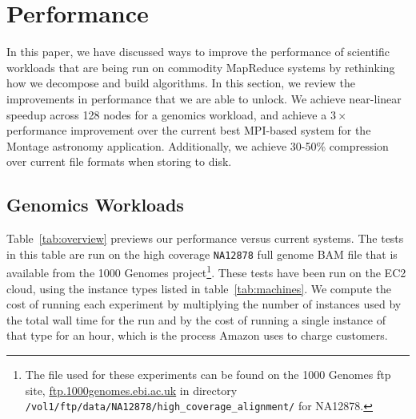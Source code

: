 \documentclass{acm_proc_article-sp}
\begin{document}
\section{Performance}
\label{sec:performance}

In this paper, we have discussed ways to improve the performance of scientific workloads that are
being run on commodity MapReduce systems by rethinking how we decompose and build algorithms.
In this section, we review the improvements in performance that we are able to unlock. We achieve
near-linear speedup across 128 nodes for a genomics workload, and achieve a $3\times$ performance
improvement over the current best MPI-based system for the Montage astronomy application.
Additionally, we achieve 30-50\% compression over current file formats when storing to disk.

\subsection{Genomics Workloads}
\label{sec:genomics-performance}

Table~\ref{tab:overview} previews our performance versus current systems. The tests in this table are run on the
high coverage \texttt{NA12878} full genome BAM file that is available from the 1000 Genomes
project\footnote{The file used for these experiments can be found on the
1000 Genomes ftp site, \url{ftp.1000genomes.ebi.ac.uk} in directory 
\texttt{/vol1/ftp/data/NA12878/high\_coverage\_alignment/} for NA12878.}. These tests have been run on the EC2 
cloud, using the instance types listed in table~\ref{tab:machines}. We compute the cost of running each
experiment by multiplying the number of instances used by the total wall time for the run and by the cost of
running a single instance of that type for an hour, which is the process Amazon uses to charge customers.
\end{document}
